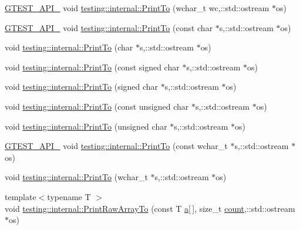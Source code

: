 \begin{DoxyCompactItemize}
\item 
\hyperlink{gtest-port_8h_aa73be6f0ba4a7456180a94904ce17790}{G\+T\+E\+S\+T\+\_\+\+A\+P\+I\+\_\+} void \hyperlink{namespacetesting_1_1internal_a3802453cf4e3f4870f589c69c7b43b2b}{testing\+::internal\+::\+Print\+To} (wchar\+\_\+t wc,\+::std\+::ostream $\ast$os)
\item 
\hyperlink{gtest-port_8h_aa73be6f0ba4a7456180a94904ce17790}{G\+T\+E\+S\+T\+\_\+\+A\+P\+I\+\_\+} void \hyperlink{namespacetesting_1_1internal_afc6dad64c4dd4799036f252c07d8a59f}{testing\+::internal\+::\+Print\+To} (const char $\ast$s,\+::std\+::ostream $\ast$os)
\item 
void \hyperlink{namespacetesting_1_1internal_ae04a499cedbda0b244c216211081a8b6}{testing\+::internal\+::\+Print\+To} (char $\ast$s,\+::std\+::ostream $\ast$os)
\item 
void \hyperlink{namespacetesting_1_1internal_af4616278b2c3ac265ad80481e0ce8da7}{testing\+::internal\+::\+Print\+To} (const signed char $\ast$s,\+::std\+::ostream $\ast$os)
\item 
void \hyperlink{namespacetesting_1_1internal_abac47db29a65b1633028fe8001f57212}{testing\+::internal\+::\+Print\+To} (signed char $\ast$s,\+::std\+::ostream $\ast$os)
\item 
void \hyperlink{namespacetesting_1_1internal_a96409c0b7d8ce520c40a0aa5eb9280b6}{testing\+::internal\+::\+Print\+To} (const unsigned char $\ast$s,\+::std\+::ostream $\ast$os)
\item 
void \hyperlink{namespacetesting_1_1internal_a10f8d85ee591c315557372669c02fbb7}{testing\+::internal\+::\+Print\+To} (unsigned char $\ast$s,\+::std\+::ostream $\ast$os)
\item 
\hyperlink{gtest-port_8h_aa73be6f0ba4a7456180a94904ce17790}{G\+T\+E\+S\+T\+\_\+\+A\+P\+I\+\_\+} void \hyperlink{namespacetesting_1_1internal_a9f0cce661c0cff119402169bb08131fa}{testing\+::internal\+::\+Print\+To} (const wchar\+\_\+t $\ast$s,\+::std\+::ostream $\ast$os)
\item 
void \hyperlink{namespacetesting_1_1internal_a43ae763e7cd5602ebbd9bdc5884203f0}{testing\+::internal\+::\+Print\+To} (wchar\+\_\+t $\ast$s,\+::std\+::ostream $\ast$os)
\item 
{\footnotesize template$<$typename T $>$ }\\void \hyperlink{namespacetesting_1_1internal_aba630c2fa49dd2b4bce3de24e70aec9f}{testing\+::internal\+::\+Print\+Raw\+Array\+To} (const T \hyperlink{_07copy_08_2_read_camera_model_8m_a551a3d351eadcc0b9b1a2f24f0fb5ea0}{a}\mbox{[}$\,$\mbox{]}, size\+\_\+t \hyperlink{gmock__stress__test_8cc_afd9db40e3361ae09188795e8cbe19752}{count},\+::std\+::ostream $\ast$os)

\end{DoxyCompactItemize}
